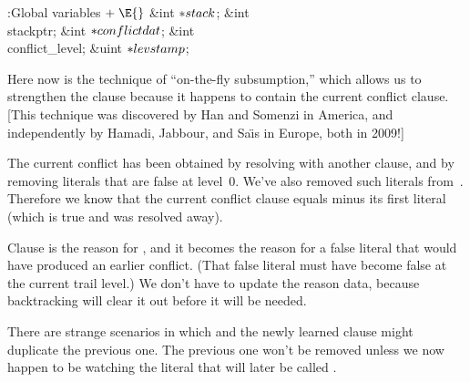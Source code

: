 \B{}:Global variables\X${}\mathrel+\E{}$\6
\&{int} ${}{*}\\{stack}{}$;\6
\&{int} \\{stackptr};\6
\&{int} ${}{*}\\{conflictdat}{}$;\6
\&{int} \\{conflict\_level};%
\6
\&{uint} ${}{*}\\{levstamp}{}$;\par
\fi

Here now is the technique of ``on-the-fly subsumption,''
which allows us
to strengthen the clause  because it happens to contain the current
conflict clause.
[This technique was discovered by Han and Somenzi in America, and
independently by Hamadi, Jabbour, and Sa{\"\i}s in Europe,
both in 2009!]

The current conflict has been obtained by resolving  with another
clause,
and by removing literals that are false at level~0. We've also removed
such literals from~. Therefore we know that the current conflict clause
equals  minus its first literal (which is true and was resolved away).

Clause  is the reason for , and it becomes the reason for a
false literal that would have produced an earlier conflict.
(That false literal must have become false at the current trail level.)
We don't have to update the reason data, because backtracking will
clear it out before it will be needed.

There are strange scenarios in which  and the
newly
learned clause might duplicate the previous one. The previous one
won't be removed unless we now happen to be watching the literal that will
later be called .

